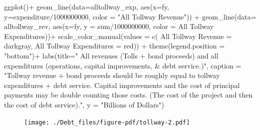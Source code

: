 \documentclass[
  letterpaper,
  DIV=11,
  numbers=noendperiod]{scrreport}
\newenvironment{Shaded}{\begin{snugshade}}{\end{snugshade}}
\newcommand{\AttributeTok}[1]{\textcolor[rgb]{0.40,0.45,0.13}{#1}}
\newcommand{\DecValTok}[1]{\textcolor[rgb]{0.68,0.00,0.00}{#1}}
\newcommand{\FunctionTok}[1]{\textcolor[rgb]{0.28,0.35,0.67}{#1}}
\newcommand{\NormalTok}[1]{\textcolor[rgb]{0.00,0.23,0.31}{#1}}
\newcommand{\OtherTok}[1]{\textcolor[rgb]{0.00,0.23,0.31}{#1}}
\newcommand{\SpecialCharTok}[1]{\textcolor[rgb]{0.37,0.37,0.37}{#1}}
\newcommand{\StringTok}[1]{\textcolor[rgb]{0.13,0.47,0.30}{#1}}
\begin{document}
\begin{Shaded}
\begin{Highlighting}[]
\FunctionTok{ggplot}\NormalTok{()}\SpecialCharTok{+}
  \FunctionTok{geom\_line}\NormalTok{(}\AttributeTok{data=}\NormalTok{alltollway\_exp, }\FunctionTok{aes}\NormalTok{(}\AttributeTok{x=}\NormalTok{fy, }\AttributeTok{y=}\NormalTok{expenditure}\SpecialCharTok{/}\DecValTok{1000000000}\NormalTok{, }\AttributeTok{color =} \StringTok{"All Tollway Revenue"}\NormalTok{)) }\SpecialCharTok{+}
  \FunctionTok{geom\_line}\NormalTok{(}\AttributeTok{data=}\NormalTok{ alltollway\_rev, }\FunctionTok{aes}\NormalTok{(}\AttributeTok{x=}\NormalTok{fy, }\AttributeTok{y =}\NormalTok{ sum}\SpecialCharTok{/}\DecValTok{1000000000}\NormalTok{, }\AttributeTok{color =} \StringTok{\textquotesingle{}All Tollway Expenditures\textquotesingle{}}\NormalTok{))}\SpecialCharTok{+} 
  \FunctionTok{scale\_color\_manual}\NormalTok{(}\AttributeTok{values =} \FunctionTok{c}\NormalTok{(}
    \StringTok{\textquotesingle{}All Tollway Revenue\textquotesingle{}} \OtherTok{=} \StringTok{\textquotesingle{}darkgray\textquotesingle{}}\NormalTok{,}
    \StringTok{\textquotesingle{}All Tollway Expenditures\textquotesingle{}} \OtherTok{=} \StringTok{\textquotesingle{}red\textquotesingle{}}\NormalTok{)) }\SpecialCharTok{+}
  \FunctionTok{theme}\NormalTok{(}\AttributeTok{legend.position =} \StringTok{"bottom"}\NormalTok{)}\SpecialCharTok{+}
  \FunctionTok{labs}\NormalTok{(}\AttributeTok{title=}\StringTok{" All revenues (Tolls + bond proceeds) and all expenditures (operations, capital improvements, \& debt service.)"}\NormalTok{, }
       \AttributeTok{caption =} \StringTok{"Tollway revenue + bond proceeds should be roughly equal to tollway expenditures + debt service.}
\StringTok{       Capital improvements and the cost of principal payments may be double counting those costs.}
\StringTok{       (The cost of the project and then the cost of debt service)."}\NormalTok{, }
       \AttributeTok{y =} \StringTok{"Billions of Dollars"}\NormalTok{)}
\end{Highlighting}
\end{Shaded}

\begin{figure}[H]

{\centering \texttt{[image: ./Debt\_files/figure-pdf/tollway-2.pdf]}

}

\end{figure}

\hypertarget{section-2}{%
\subsubsection{}\label{section-2}}
\end{document}

